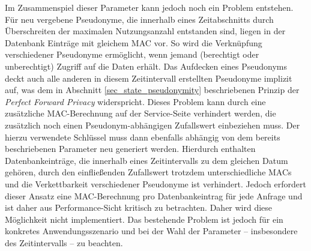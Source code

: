 Im Zusammenspiel dieser Parameter kann jedoch noch ein Problem entstehen. Für neu vergebene Pseudonyme, die innerhalb eines Zeitabschnitts durch Überschreiten der maximalen Nutzungsanzahl entstanden sind, liegen in der Datenbank Einträge mit gleichem MAC vor. So wird die Verknüpfung verschiedener Pseudonyme ermöglicht, wenn jemand (berechtigt oder unberechtigt) Zugriff auf die Daten erhält. Das Aufdecken eines Pseudonyms deckt auch alle anderen in diesem Zeitintervall erstellten Pseudonyme implizit auf, was dem in Abschnitt \ref{sec_state_pseudonymity} beschriebenen Prinzip der \textit{Perfect Forward Privacy} widerspricht. 
Dieses Problem kann durch eine zusätzliche MAC-Berechnung auf der Service-Seite verhindert werden, die zusätzlich noch einen Pseudonym-abhängigen Zufallswert einbeziehen muss. Der hierzu verwendete Schlüssel muss dann ebenfalls abhängig von dem bereits beschriebenen Parameter neu generiert werden. Hierdurch enthalten Datenbankeinträge, die innerhalb eines Zeitintervalls zu dem gleichen Datum gehören, durch den einfließenden Zufallswert trotzdem unterschiedliche MACs und die Verkettbarkeit verschiedener Pseudonyme ist verhindert. 
Jedoch erfordert dieser Ansatz eine MAC-Berechnung pro Datenbankeintrag für jede Anfrage und ist daher aus Performance-Sicht kritisch zu betrachten. Daher wird diese Möglichkeit nicht implementiert. Das bestehende Problem ist jedoch für ein konkretes Anwendungsszenario und bei der Wahl der Parameter -- insbesondere des Zeitintervalls -- zu beachten.


